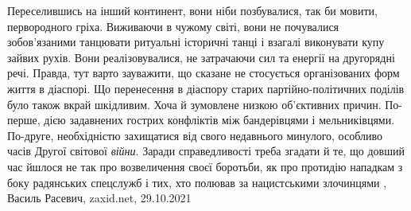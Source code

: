 Переселившись на інший континент, вони ніби позбувалися, так би мовити,
первородного гріха. Виживаючи в чужому світі, вони не почувалися зобов’язаними
танцювати ритуальні історичні танці і взагалі виконувати купу зайвих рухів.
Вони реалізовувалися, не затрачаючи сил та енергії на другорядні речі. Правда,
тут варто зауважити, що сказане не стосується організованих форм життя в
діаспорі. Що перенесення в діаспору старих партійно-політичних поділів було
також вкрай шкідливим. Хоча й зумовлене низкою об’єктивних причин. По-перше,
дією задавнених гострих конфліктів між бандерівцями і мельниківцями. По-друге,
необхідністю захищатися від свого недавнього минулого, особливо часів Другої
світової \emph{війни}. Заради справедливості треба згадати й те, що довший час йшлося
не так про возвеличення своєї боротьби, як про протидію нападкам з боку
радянських спецслужб і тих, хто полював за нацистськими злочинцями
, 
Василь Расевич, zaxid.net, 29.10.2021

